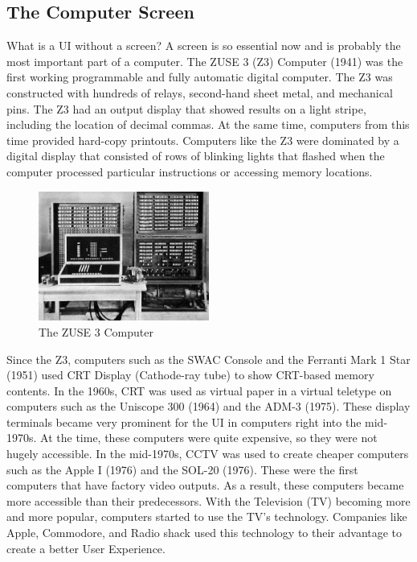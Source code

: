 \documentclass{article}
\begin{document}
\subsection{The Computer Screen}
What is a UI without a screen? A screen is so essential now and is probably the most important part of a computer. The ZUSE 3 (Z3) Computer (1941) was the first working programmable and fully automatic digital computer.  The Z3 was constructed with hundreds of relays, second-hand sheet metal, and mechanical pins. The Z3 had an output display that showed results on a light stripe, including the location of decimal commas. At the same time, computers from this time provided hard-copy printouts. Computers like the Z3 were dominated by a digital display that consisted of rows of blinking lights that flashed when the computer processed particular instructions or accessing memory locations. 
\cite{ref4} \cite{ref5}

\begin{figure}[!h]
    \caption{The ZUSE 3 Computer}
    \label{image:ZUSE3}
    \centering
    \includegraphics[width=0.5\textwidth]{pics/z3.jpg}
\end{figure}

Since the Z3, computers such as the SWAC Console and the Ferranti Mark 1 Star (1951) used CRT Display (Cathode-ray tube) to show CRT-based memory contents. In the 1960s, CRT was used as virtual paper in a virtual teletype on computers such as the Uniscope 300 (1964) and the ADM-3 (1975). These display terminals became very prominent for the UI in computers right into the mid-1970s. At the time, these computers were quite expensive, so they were not hugely accessible. In the mid-1970s, CCTV was used to create cheaper computers such as the Apple I (1976) and the SOL-20 (1976). These were the first computers that have factory video outputs. As a result, these computers became more accessible than their predecessors. With the Television (TV) becoming more and more popular, computers started to use the TV’s technology. Companies like Apple, Commodore, and Radio shack used this technology to their advantage to create a better User Experience.
\end{document}
